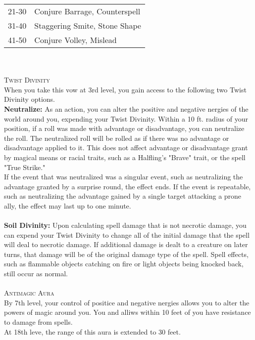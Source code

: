 \documentclass[22pt,a4paper]{article}
\begin{document}
\begin{multicols*}{2}
\begin{tabular}{cl}
21-30              & Conjure Barrage, Counterspell \\
31-40              & Staggering Smite, Stone Shape \\
\rowcolor[HTML]{B0E1AF} 
41-50              & Conjure Volley, Mislead      
\end{tabular}\\
\\
{\fontsize{12pt}{12pt}\textcolor{title}{\textsc{Twist Divinity}}}\\
When you take this vow at 3rd level, you gain access to the following two Twist Divinity options.\\
\indent\textbf{Neutralize: }As an action, you can alter the positive and negative nergies of the world around you, expending your Twist Divinity. Within a 10 ft. radius of your position, if a roll was made with advantage or disadvantage, you can neutralize the roll. The neutralized roll will be rolled as if there was no advantage or disadvantage applied to it. This does not affect advantage or disadvantage grant by magical means or racial traits, such as a Halfling's "Brave" trait, or the spell "True Strike."\\
\indent If the event that was neutralized was a singular event, such as neutralizing the advantage granted by a surprise round, the effect ends. If the event is repeatable, such as neutralizing the advantage gained by a single target attacking a prone ally, the effect may last up to one minute.\\
\\
\indent\textbf{Soil Divinity: }Upon calculating spell damage that is not necrotic damage, you can expend your Twist Divinity to change all of the initial damage that the spell will deal to necrotic damage. If additional damage is dealt to a creature on later turns, that damage will be of the original damage type of the spell. Spell effects, such as flammable objects catching on fire or light objects being knocked back, still occur as normal.\\
\\
{\fontsize{12pt}{12pt}\textcolor{title}{\textsc{Antimagic Aura}}}\\
By 7th level, your control of positice and negative nergies allows you to alter the powers of magic around you. You and alliws within 10 feet of you have resistance to damage from spells.\\
\indent At 18th leve, the range of this aura is extended to 30 feet.\\
\\

\end{multicols*}
\end{document}
